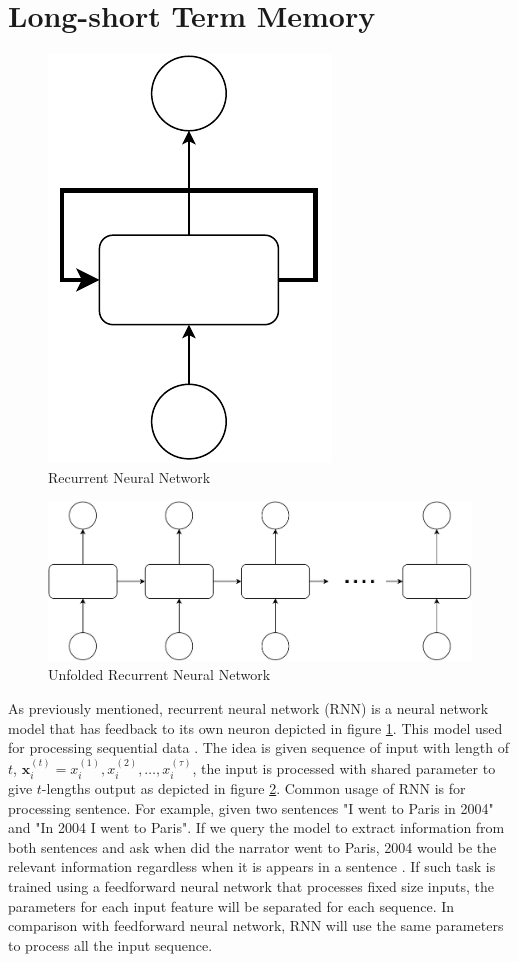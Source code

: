 \section{Long-short Term Memory}
    \begin{figure}[H]
        \centering
        \includegraphics[width=.15\linewidth]{images/rnn.pdf}
        \caption{Recurrent Neural Network}
        \label{fig:rnn}
    \end{figure}
    \begin{figure}[H]
        \centering
        \includegraphics[width=.6\linewidth]{images/unfolded_rnn.pdf}
        \caption{Unfolded Recurrent Neural Network}
        \label{fig:unfolded_rnn}
    \end{figure}
    As previously mentioned, recurrent neural network (RNN) is a
    neural network model that has feedback to its own neuron depicted
    in figure \ref{fig:rnn}. This model used for processing sequential
    data \citep{Goodfellow-et-al-2016}. The idea is given sequence of
    input with length of $t$, $\mathbf{x}_i^{(t)} = x_i^{(1)}, x_i^{(2)},
    \dots, x_i^{(\tau)}$, the input is processed with shared parameter to
    give $t$-lengths output as depicted in figure
    \ref{fig:unfolded_rnn}. Common usage of RNN is for processing
    sentence. For example, given two sentences "I went to Paris in
    2004" and "In 2004 I went to Paris". If we query the model to
    extract information from both sentences and ask when did the
    narrator went to Paris, 2004 would be the relevant information
    regardless when it is appears in a sentence
    \citep{Goodfellow-et-al-2016}. If such task is trained using a
    feedforward neural network that processes fixed size inputs, the
    parameters for each input feature will be separated for each
    sequence. In comparison with feedforward neural network, RNN will
    use the same parameters to process all the input sequence. 

